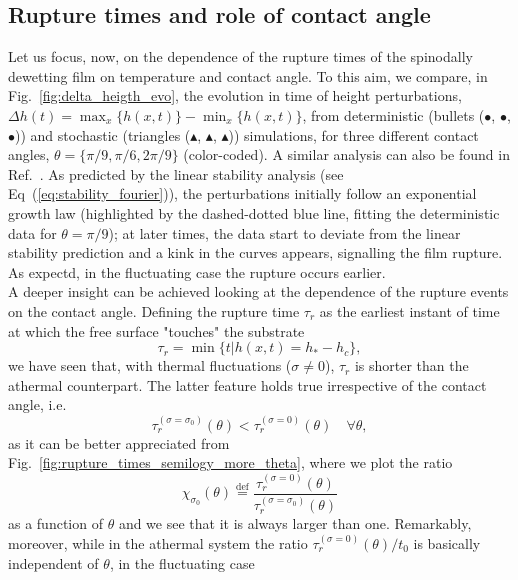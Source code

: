 \subsection{Rupture times and role of contact angle}\label{subsec:results_contact_angle}
Let us focus, now, on the dependence of the rupture times of the spinodally dewetting film on temperature and contact angle. 
To this aim, we compare, in Fig.~\ref{fig:delta_heigth_evo}, the evolution in time of height perturbations, $\Delta h(t) = \max_x\{h(x,t)\} - \min_x\{h(x,t)\}$, from deterministic (bullets (\textcolor{pyblue}{$\bullet$}, \textcolor{pyorange}{$\bullet$}, \textcolor{pygreen}{$\bullet$})) and stochastic (triangles (\textcolor{pyblue}{$\blacktriangle$}, \textcolor{pyorange}{$\blacktriangle$}, \textcolor{pygreen}{$\blacktriangle$})) simulations, for three different contact angles, $\theta = \{ \pi/9, \pi/6, 2\pi/9 \}$ (color-coded).
A similar analysis can also be found in Ref.~\cite{pahlavanThinFilmsPartial2018}.
As predicted by the linear stability analysis (see Eq~(\ref{eq:stability_fourier})), the perturbations initially follow an exponential growth law (highlighted by the dashed-dotted blue line, fitting the deterministic data for $\theta=\pi/9$); at later times, the data start to deviate from the linear stability 
prediction and a kink in the curves appears, signalling the film rupture. 
As expectd, in the fluctuating case the rupture occurs earlier. \\
A deeper insight can be achieved looking at the dependence of the rupture events on the contact angle. Defining the rupture time $\tau_r$ as 
the earliest instant of time at which the free surface "touches" the substrate
$$
  \tau_r = \min\{t|h(x,t) = h_{\ast}-h_c\},
$$
we have seen that, with thermal fluctuations ($\sigma \neq 0$), $\tau_r$ is shorter than the athermal counterpart.
The latter feature holds true irrespective of the contact angle, i.e. 
$$
  \tau_r^{(\sigma=\sigma_0)}(\theta) < \tau_r^{(\sigma=0)}(\theta) \quad \forall \theta,
$$
as it can be better appreciated from Fig.~\ref{fig:rupture_times_semilogy_more_theta}, where we plot 
the ratio
\begin{equation}\label{eq:defchi}
  \chi_{\sigma_0}(\theta) \stackrel{\text{def}}{=} \frac{\tau_r^{(\sigma=0)}(\theta)}{\tau_r^{(\sigma=\sigma_0)}(\theta)}
\end{equation}
as a function of $\theta$ and we see that it is always larger than one. 
Remarkably, moreover, while in the athermal system the ratio $\tau_r^{(\sigma=0)}(\theta)/t_0$ is basically independent of $\theta$, in the fluctuating case
